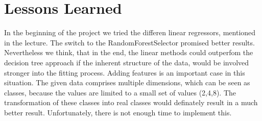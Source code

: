 \documentclass[a4paper, 11pt]{article}
\begin{document}
\section{Lessons Learned}
In the beginning of the project we tried the differen linear regressors, mentioned in the lecture. The switch to the RandomForestSelector promised better results. Nevertheless we think, that in the end, the linear methods could outperfom the decision tree approach if the inherent structure of the data, would be involved stronger into the fitting process. Adding features is an important case in this situation. The given data comprises multiple dimensions, which can be seen as classes, because the values are limited to a small set of values (2,4,8). The transformation of these classes into real classes would definately result in a much better result. Unfortunately, there is not enough time to implement this.
\end{document}
